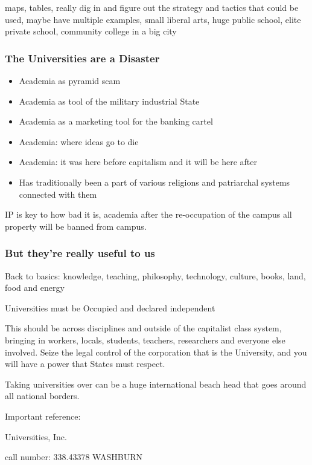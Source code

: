 maps, tables, really dig in and figure out the strategy and tactics that
could be used, maybe have multiple examples, small liberal arts, huge
public school, elite private school, community college in a big city

\subsubsection{The Universities are a
Disaster}\label{the-universities-are-a-disaster}

\begin{itemize}
\item
  Academia as pyramid scam
\item
  Academia as tool of the military industrial State
\item
  Academia as a marketing tool for the banking cartel
\item
  Academia: where ideas go to die
\item
  Academia: it was here before capitalism and it will be here after
\item
  Has traditionally been a part of various religions and patriarchal
  systems connected with them
\end{itemize}

IP is key to how bad it is, academia after the re-occupation of the
campus all property will be banned from campus.

\subsubsection{But they're really useful to
us}\label{but-theyre-really-useful-to-us}

Back to basics: knowledge, teaching, philosophy, technology, culture,
books, land, food and energy

Universities must be Occupied and declared independent

This should be across disciplines and outside of the capitalist class
system, bringing in workers, locals, students, teachers, researchers and
everyone else involved. Seize the legal control of the corporation that
is the University, and you will have a power that States must respect.

Taking universities over can be a huge international beach head that
goes around all national borders.

Important reference:

Universities, Inc.

call number: 338.43378 WASHBURN

